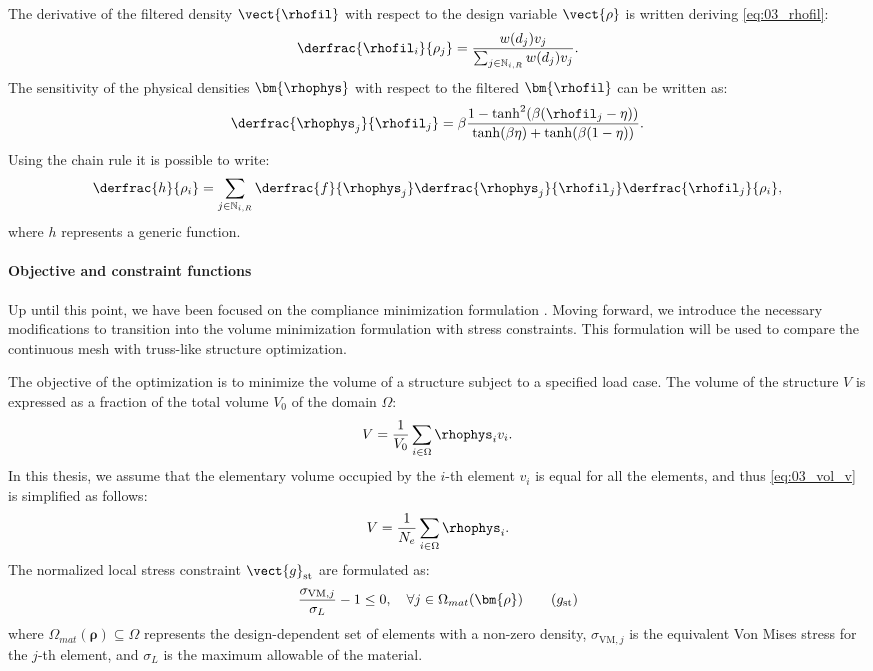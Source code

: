 The derivative of the filtered density $\vect{\rhofil}$ with respect to the design variable $\vect{\rho}$ is written deriving \eqref{eq:03_rhofil}:
\begin{equation}
    \derfrac{\rhofil_i}{\rho_j} = \frac{w(d_j)v_j}{\sum_{j \in \mathbb{N}_{i,R}} w(d_j)v_j}.
    \label{eq:03_sens_filt}
\end{equation}
The sensitivity of the physical densities $\bm{\rhophys}$ with respect to the filtered $\bm{\rhofil}$ can be written as:
\begin{equation}
    \derfrac{\rhophys_j}{\rhofil_j} = \beta \frac{1-\tanh^2(\beta(\rhofil_j-\eta))}{\tanh(\beta\eta)+\tanh(\beta(1 - \eta))}.
    \label{eq:03_sens_proj}
\end{equation}
Using the chain rule it is possible to write:
\begin{equation}
    \label{eq:03_chain}
    \derfrac{h}{\rho_i} = \sum_{j \in \mathbb{N}_{i,R}} \derfrac{f}{\rhophys_j} \derfrac{\rhophys_j}{\rhofil_j} \derfrac{\rhofil_j}{\rho_i},
\end{equation}
where $h$ represents a generic function.
\paragraph{Objective and constraint functions}
Up until this point, we have been focused on the compliance minimization formulation . Moving forward, we introduce the necessary modifications to transition into the volume minimization formulation with stress constraints. This formulation will be used to compare the continuous mesh with truss-like structure optimization.

The objective of the optimization is to minimize the volume of a structure subject to a specified load case. The volume of the structure $V$ is expressed as a fraction of the total volume $V_0$ of the domain $\Omega$:
\begin{equation}
    V = \frac{1}{V_0}\sum_{i \in \Omega} \rhophys_i v_i.
    \label{eq:03_vol_v}
\end{equation}
In this thesis, we assume that the elementary volume occupied by the $i$-th element $v_i$ is equal for all the elements, and thus \eqref{eq:03_vol_v} is simplified as follows:
\begin{equation}
    V = \frac{1}{N_{e}} \sum_{i \in \Omega} \rhophys_i. 
    \label{eq:03_obj_vol}  
\end{equation}
The normalized local stress constraint $\vect{g}_{\text{st}}$ are formulated as:
\begin{equation}
    \frac{\sigma_{\text{VM},j}}{\sigma_L}-1 \leq 0, \quad \forall j \in \Omega_{mat}(\bm{\rho})
    \tag{$g_{\text{st}}$}
\end{equation}
where $\Omega_{mat}(\bm{\rho}) \subseteq \Omega$ represents the design-dependent set of elements with a non-zero density, $\sigma_{\text{VM},j}$ is the equivalent Von Mises stress for the $j$-th element, and $\sigma_L$ is the maximum allowable of the material.

